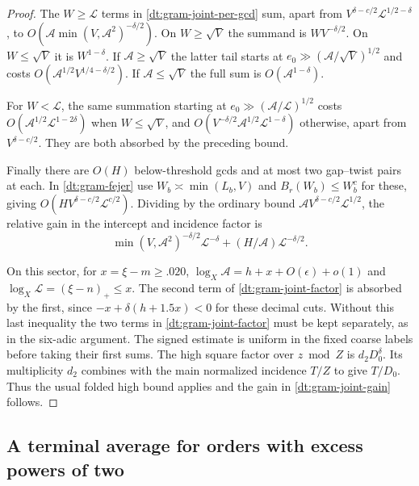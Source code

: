 \documentclass[11pt,a4paper]{article}
\theoremstyle{paperplain}
\numberwithin{equation}{section}
\begin{document}
\begin{proof}
The \(W\ge\mathcal L\) terms in
\eqref{dt:gram-joint-per-gcd} sum, apart from
\(V^{\delta-c/2}\mathcal L^{1/2-\delta}\), to
\(O(\mathcal A\min(V,\mathcal A^2)^{-\delta/2})\).
On \(W\ge\sqrt V\) the summand is \(W V^{-\delta/2}\).
On \(W\le\sqrt V\) it is \(W^{1-\delta}\). If
\(\mathcal A\ge\sqrt V\) the latter tail starts at
\(e_0\gg(\mathcal A/\sqrt V)^{1/2}\) and costs
\(O(\mathcal A^{1/2}V^{1/4-\delta/2})\).
If \(\mathcal A\le\sqrt V\) the full sum is
\(O(\mathcal A^{1-\delta})\).

For \(W<\mathcal L\), the same summation starting at
\(e_0\gg(\mathcal A/\mathcal L)^{1/2}\) costs
\(O(\mathcal A^{1/2}\mathcal L^{1-2\delta})\) when
\(W\le\sqrt V\), and
\(O(V^{-\delta/2}\mathcal A^{1/2}\mathcal L^{1-\delta})\)
otherwise, apart from \(V^{\delta-c/2}\).
They are both absorbed by the preceding bound.

Finally there are \(O(H)\) below-threshold gcds and
at most two gap--twist pairs at each. In
\eqref{dt:gram-fejer} use \(W_b\asymp\min(L_b,V)\)
and \(B_r(W_b)\le W_b^c\) for these, giving
\(O(HV^{\delta-c/2}\mathcal L^{c/2})\).
Dividing by the ordinary bound
\(\mathcal A V^{\delta-c/2}\mathcal L^{1/2}\),
the relative gain in the intercept and incidence factor is
\begin{equation}
   \min(V,\mathcal A^2)^{-\delta/2}\mathcal L^{-\delta}
                       +(H/\mathcal A)\mathcal L^{-\delta/2}.
 \label{dt:gram-joint-factor}
\end{equation}

On this sector, for \(x=\xi-m\ge .020\),
\(\log_X\mathcal A=h+x+O(\epsilon)+o(1)\) and
\(\log_X\mathcal L=(\xi-n)_+\le x\). The second term of
\eqref{dt:gram-joint-factor} is absorbed by the first,
since $-x+\delta(h+1.5x)<0$ for these decimal cuts.
Without this last inequality the two terms in \eqref{dt:gram-joint-factor}
must be kept separately, as in the six-adic argument.
The signed estimate is uniform in the fixed coarse labels
before taking their first sums. The high square factor
over \(z\bmod Z\) is \(d_2D_0^\delta\). Its multiplicity
\(d_2\) combines with the main normalized incidence \(T/Z\)
to give \(T/D_0\). Thus the usual folded high bound applies
and the gain in \eqref{dt:gram-joint-gain} follows.
\end{proof}

\subsection{A terminal average for orders with excess powers of two}
\end{document}
